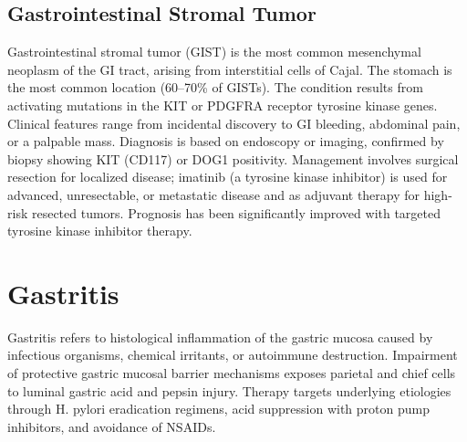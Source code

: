 \subsection{Gastrointestinal Stromal Tumor}
\label{sec:Gastrointestinal Stromal Tumor}
Gastrointestinal stromal tumor (GIST) is the most common mesenchymal neoplasm of the GI tract, arising from interstitial cells of Cajal. The stomach is the most common location (60--70\% of GISTs). The condition results from activating mutations in the KIT or PDGFRA receptor tyrosine kinase genes. Clinical features range from incidental discovery to GI bleeding, abdominal pain, or a palpable mass. Diagnosis is based on endoscopy or imaging, confirmed by biopsy showing KIT (CD117) or DOG1 positivity. Management involves surgical resection for localized disease; imatinib (a tyrosine kinase inhibitor) is used for advanced, unresectable, or metastatic disease and as adjuvant therapy for high-risk resected tumors. Prognosis has been significantly improved with targeted tyrosine kinase inhibitor therapy.

\section{Gastritis}




Gastritis refers to histological inflammation of the gastric mucosa caused by infectious organisms, chemical irritants, or autoimmune destruction. Impairment of protective gastric mucosal barrier mechanisms exposes parietal and chief cells to luminal gastric acid and pepsin injury. Therapy targets underlying etiologies through H. pylori eradication regimens, acid suppression with proton pump inhibitors, and avoidance of NSAIDs.





